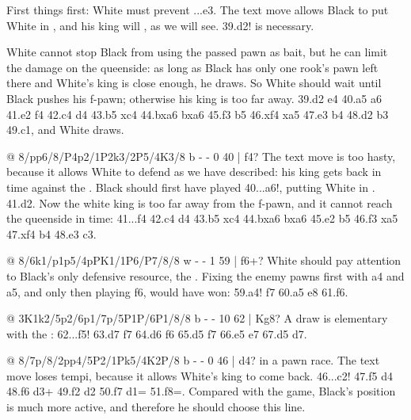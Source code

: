 First things first: White must prevent ...\K e3. The text move allows Black to put White in
, and his king will ,
as we will see. 39.\K d2! is necessary.

White cannot stop Black from using the passed pawn as bait, but he can limit the damage on the
queenside: as long as Black has only one rook's pawn left there and White's king is close enough, he
draws. So White should wait until Black pushes his f-pawn; otherwise his king is too far away.
39.\K d2 \K e4 40.a5 a6 41.\K e2 f4 42.c4 \K d4 43.b5 \K xc4 44.bxa6 bxa6 45.\K f3 \K b5 46.\K xf4
\K xa5 47.\K e3 \K b4 48.\K d2 \K b3 49.\K c1, and White draws.

@ 8/pp6/8/P4p2/1P2k3/2P5/4K3/8 b - - 0 40 | f4?
The text move is too hasty, because it allows White to defend as we have described: his king gets
back in time against the . Black should
first have played 40...a6!, putting White in . 41.\K d2. Now the white
king is too far away from the f-pawn, and it cannot reach the queenside in time: 41...f4 42.c4 \K d4
43.b5 \K xc4 44.bxa6 bxa6 45.\K e2 \K b5 46.\K f3 \K xa5 47.\K xf4 \K b4 48.\K e3 \K c3.

@ 8/6k1/p1p5/4pPK1/1P6/P7/8/8 w - - 1 59 | f6+?
White should pay attention to Black's only defensive resource, the
. Fixing the enemy pawns first
with a4 and a5, and only then playing f6, would have won: 59.a4! \K f7 60.a5 \K e8 61.f6.

@ 3K1k2/5p2/6p1/7p/5P1P/6P1/8/8 b - - 10 62 | Kg8?
A draw is elementary with the : 62...f5!
63.\K d7 \K f7 64.\K d6 \K f6 65.\K d5 \K f7 66.\K e5 \K e7 67.\K d5 \K d7.

@ 8/7p/8/2pp4/5P2/1Pk5/4K2P/8 b - - 0 46 | d4?
 in a pawn race.
The text move loses tempi, because it allows White's king to come back. 46...\K c2! 47.f5 d4 48.f6
d3+ 49.\K f2 d2 50.f7 d1=\Q{} 51.f8=\Q{}. Compared with the game, Black's position is much more
active, and therefore he should choose this line.

